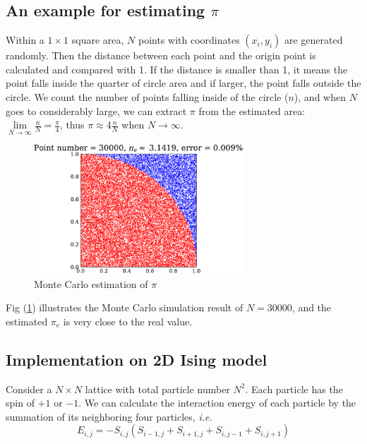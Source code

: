 \documentclass[11pt, a4paper]{article}
\begin{document}
\subsection{An example for estimating $\pi$}

Within a $1\times 1$ square area, $N$ points with coordinates $(x_i, y_i)$ are generated randomly. Then the distance between each point and the origin point is calculated and compared with 1. If the distance is smaller than 1, it means the point falls inside the quarter of circle area and if larger, the point falls outside the circle. We count the number of points falling inside of the circle ($n$), and when $N$ goes to considerably large, we can extract $\pi$ from the estimated area: $\lim\limits_{N\to \infty} \frac{n}{N} = \frac{\pi}{4}$, thus $\pi \approx 4\frac{n}{N}$ when $N\to\infty$.
\begin{figure}[H]
\centering
\includegraphics[width=0.7\textwidth]{fig/piEstimation.pdf}\vspace*{-4mm}
\caption{Monte Carlo estimation of $\pi$}\label{fig:Monte Carlo Pi}
\end{figure}

Fig (\ref{fig:Monte Carlo Pi}) illustrates the Monte Carlo simulation result of $N=30000$, and the estimated $\pi_e$ is very close to the real value.

\subsection{Implementation on 2D Ising model}
Consider a $N\times N$ lattice with total particle number $N^2$. Each particle has the spin of $+1$ or $-1$. We can calculate the interaction energy of each particle by the summation of its neighboring four particles, \textit{i.e.}
\begin{equation}
E_{i,j} = -S_{i,j} (S_{i-1, j} + S_{i+1, j} + S_{i, j-1} + S_{i, j+1}) \label{eq:neighboring energy}
\end{equation}
\end{document}
